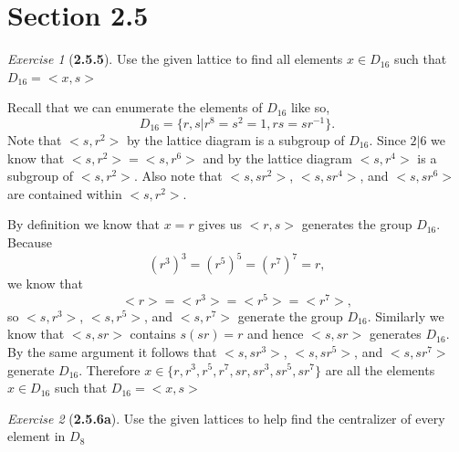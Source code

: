 \documentclass[12pt]{amsart}
\makeatletter
\theoremstyle{remark}
\newtheorem*{exercise}{Exercise}%
\renewenvironment{proof}[1][\proofname]{\par\doublespacing
  \pushQED{\qed}%
  \normalfont \topsep6\p@\@plus6\p@\relax
  \list{}{%
    \settowidth{\leftmargin}{\itshape\proofname:\hskip\labelsep}%
    \setlength{\labelwidth}{0pt}%
    \setlength{\itemindent}{-\leftmargin}%
  }%
  \item[\hskip\labelsep\itshape#1\@addpunct{:}]\ignorespaces
}{%
  \popQED\endlist\@endpefalse
  \singlespacing
}
\theoremstyle{mycomment}
\makeatother
\begin{document}
\section*{\textbf{Section 2.5}}


\begin{exercise}[\textbf{2.5.5}] Use the given lattice to find all elements $x \in D_{16}$ such that $D_{16} = <x, s>$
    \begin{proof} Recall that we can enumerate the elements of $D_{16}$ like so, 
      \begin{equation*}
        D_{16} = \{r, s| r^8 = s^2 = 1, rs = sr^{-1}\}. 
      \end{equation*}
      Note that $<s, r^2>$ by the lattice diagram is a subgroup of $D_{16}$. Since $2|6$ we know that 
      $<s, r^2> = <s, r^6>$ and by the lattice diagram $<s, r^4>$ is a subgroup of $<s, r^2>$. Also note that 
      $<s, sr^2>$, $<s,sr^4>$, and $<s, sr^6>$ are contained within $<s, r^2>$. 

      By definition we know that $x = r$ gives us $<r, s>$ generates the group $D_{16}$. Because 
      \begin{equation*}
        (r^3)^3 = (r^5)^5 = (r^7)^7 = r, 
      \end{equation*} 
      we know that 
      \begin{equation*}
        <r> = <r^3> = <r^5> = <r^7>, 
      \end{equation*}
      so $<s, r^3>$, $<s, r^5>$, and $<s, r^7>$ generate the group $D_{16}$.
      Similarly we know that $<s, sr>$ contains $s(sr) = r$ and hence $<s, sr>$ generates $D_{16}$. By the same argument it follows that 
      $<s, sr^3>$, $<s, sr^5>$, and $<s, sr^7>$ generate $D_{16}$. Therefore $x \in \{r, r^3, r^5, r^7, sr, sr^3, sr^5, sr^7\}$ are all the elements $x \in D_{16}$ such that $D_{16} = <x, s>$ 
    \end{proof}

\end{exercise}
\vspace{.15in}




\begin{exercise}[\textbf{2.5.6a}] Use the given lattices to help find the centralizer of every element in $D_8$
  \begin{proof}[Solution:]
  \end{proof}

\end{exercise}
\vspace{.15in}
\end{document}
